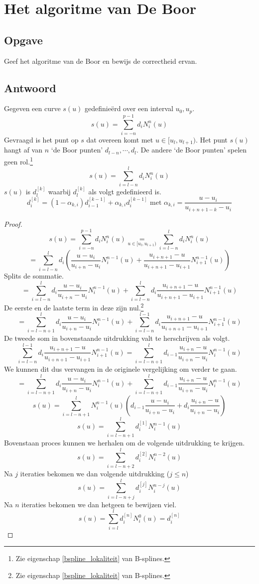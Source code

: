 \documentclass[examenvragen.tex]{subfiles}
\begin{document}
\section{Het algoritme van De Boor}
\subsection{Opgave}
Geef het algoritme van de Boor en bewijs de correctheid ervan.

\subsection{Antwoord}

Gegeven een curve $s(u)$ gedefinie\"erd over een interval $u_0,u_p$. 
\[
s(u) = \sum_{i=-n}^{p-1}d_iN_{i}^{n}(u)
\]
Gevraagd is het punt op $s$ dat overeen komt met $u\in [u_l,u_{l+1})$. Het punt $s(u)$ hangt af van $n$ `de Boor punten' $d_{l-n},\cdots,d_{l}$. De andere `de Boor punten' spelen geen rol.\footnote{Zie eigenschap \ref{bspline_lokaliteit} van B-splines.}
\[
s(u) = \sum_{i=l-n}^{l}d_{i}N_{i}^{n}(u)
\]
$s(u)$ is $d_{l}^{[k]}$ waarbij $d_{l}^{[k]}$ als volgt gedefinieerd is.
\[
d_{i}^{[k]}
= (1-\alpha_{k,i})d_{i-1}^{[k-1]}
+ \alpha_{k,i}d_{i}^{[k-1]}
\text{ met }
\alpha_{k,i} = \frac{u-u_i}{u_{i+n+1-k}-u_{i}}
\]

\begin{proof}
\[
s(u)
= \sum_{i=-n}^{p-1}d_iN_{i}^{n}(u)
\underset{u \in [u_l,u_{l+1})}{=}
\sum_{i=l-n}^{l}d_iN_{i}^{n}(u)
\]
\[
=
\sum_{i=l-n}^{l}d_i
\left(
\frac{u-u_i}{u_{i+n}-u_i}N_i^{n-1}(u) + 
\frac{u_{i+n+1}-u}{u_{i+n+1}-u_{i+1}}N_{i+1}^{n-1}(u)
\right)
\]
Splits de sommatie.
\[
=
\sum_{i=l-n}^{l}d_i
\frac{u-u_i}{u_{i+n}-u_i}N_i^{n-1}(u) + 
\sum_{i=l-n}^{l}d_i
\frac{u_{i+n+1}-u}{u_{i+n+1}-u_{i+1}}N_{i+1}^{n-1}(u)
\]
De eerste en de laatste term in deze zijn nul.\footnote{Zie eigenschap \ref{bspline_lokaliteit} van B-splines.}
\[
=
\sum_{i=l-n+1}^{l}d_i
\frac{u-u_i}{u_{i+n}-u_i}N_i^{n-1}(u) + 
\sum_{i=l-n}^{l-1}d_i
\frac{u_{i+n+1}-u}{u_{i+n+1}-u_{i+1}}N_{i+1}^{n-1}(u)
\]
De tweede som in bovenstaande uitdrukking valt te herschrijven als volgt.
\[
\sum_{i=l-n}^{l-1}d_i
\frac{u_{i+n+1}-u}{u_{i+n+1}-u_{i+1}}N_{i+1}^{n-1}(u)
=
\sum_{i=l-n+1}^{l}d_{i-1}
\frac{u_{i+n}-u}{u_{i+n}-u_{i}}N_{i}^{n-1}(u)
\]
We kunnen dit dus vervangen in de originele vergelijking om verder te gaan.
\[
=
\sum_{i=l-n+1}^{l}d_i
\frac{u-u_i}{u_{i+n}-u_i}N_i^{n-1}(u) + 
\sum_{i=l-n+1}^{l}d_{i-1}
\frac{u_{i+n}-u}{u_{i+n}-u_{i}}N_{i}^{n-1}(u)
\]
\[
s(u)
=
\sum_{i=l-n+1}^{l}
N_i^{n-1}(u)
\left(
d_{i-1}
\frac{u-u_i}{u_{i+n}-u_i} +
d_i
\frac{u_{i+n}-u}{u_{i+n}-u_{i}}
\right)
\]
\[
s(u)
= \sum_{i=l-n+1}^{l}
d_{i}^{[1]}
N_i^{n-1}(u)
\]
Bovenstaan proces kunnen we herhalen om de volgende uitdrukking te krijgen.
\[
s(u)
= \sum_{i=l-n+2}^{l}
d_{i}^{[2]}
N_i^{n-2}(u)
\]
Na $j$ iteraties bekomen we dan volgende uitdrukking ($j\le n$)
\[
s(u)
= \sum_{i=l-n+j}^{l}
d_{i}^{[j]}
N_i^{n-j}(u)
\]
Na $n$ iteraties bekomen we dan hetgeen te bewijzen viel.
\[
s(u) = \sum_{i=l}^{l}d_{i}^{[n]}N_{i}^{0}(u) = d_{i}^{[n]}
\]
\end{proof}
\end{document}
